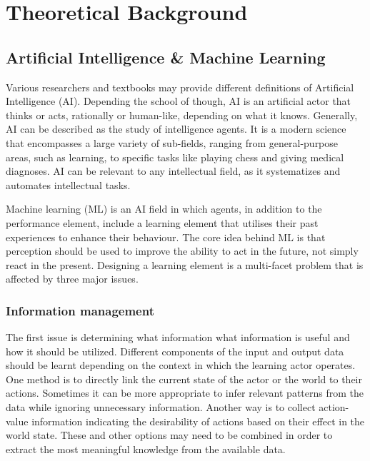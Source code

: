 \chapter{Theoretical Background}
\label{Chapter-Theoretical-Background}

\section{Artificial Intelligence \& Machine Learning}
Various researchers and textbooks may provide different definitions of Artificial Intelligence (AI). Depending the school of though, AI is an artificial actor that thinks or acts, rationally or human-like, depending on what it knows. Generally, AI can be described as the study of intelligence agents. It is a modern science that encompasses a large variety of sub-fields, ranging from general-purpose areas, such as learning, to specific tasks like playing chess and giving medical diagnoses. AI can be relevant to any intellectual field, as it systematizes and automates intellectual tasks. \cite{russell_norvig_2003_1}

Machine learning (ML) is an AI field in which agents, in addition to the performance element, include a learning element that utilises their past experiences to enhance their behaviour. The core idea behind ML is that perception should be used to improve the ability to act in the future, not simply react in the present. Designing a learning element is a multi-facet problem that is affected by three major issues. \cite{russell_norvig_2003_18}

\subsection{Information management}%
The first issue is determining what information what information is useful and how it should be utilized. Different components of the input and output data should be learnt depending on the context in which the learning actor operates. One method is to directly link the current state of the actor or the world to their actions. Sometimes it can be more appropriate to infer relevant patterns from the data while ignoring unnecessary information. Another way is to collect action-value information indicating the desirability of actions based on their effect in the world state. These and other options may need to be combined in order to extract the most meaningful knowledge from the available data.

